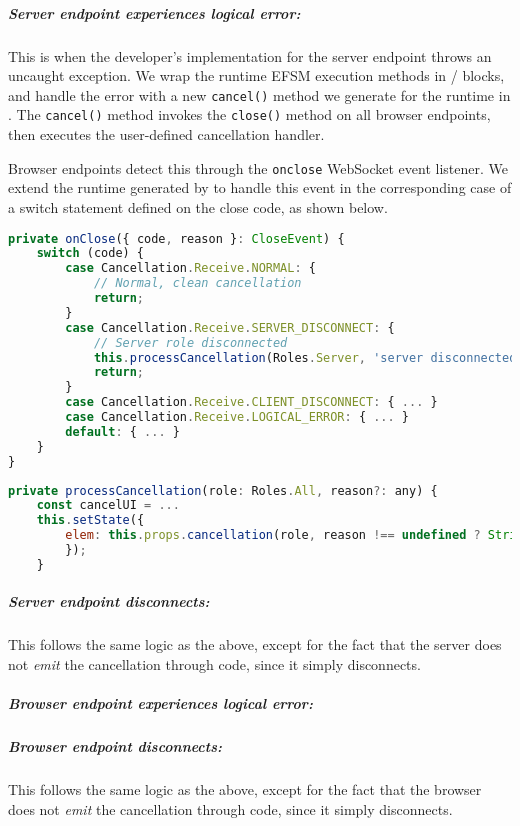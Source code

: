 \subparagraph{Server endpoint experiences logical error:}
This is when the developer's implementation for the server
endpoint throws an uncaught exception. 
We wrap the runtime EFSM execution methods in
/
blocks, and handle the error with a new \texttt{cancel()}
method we generate for the runtime in .
The \texttt{cancel()} method invokes
the \texttt{close()} method on all browser endpoints,
then executes the user-defined cancellation handler.

Browser endpoints detect this through the \texttt{onclose}
WebSocket event listener. We extend the runtime
generated by  to handle this event
in the corresponding case of a switch statement
defined on the close code, as shown below.

\begin{lstlisting}[language=javascript,tabsize=2]
private onClose({ code, reason }: CloseEvent) {
	switch (code) {
		case Cancellation.Receive.NORMAL: {
			// Normal, clean cancellation
			return;
		}
		case Cancellation.Receive.SERVER_DISCONNECT: {
			// Server role disconnected
			this.processCancellation(Roles.Server, 'server disconnected')
			return;
		}
		case Cancellation.Receive.CLIENT_DISCONNECT: { ... }
		case Cancellation.Receive.LOGICAL_ERROR: { ... }
		default: { ... }
	}
}
\end{lstlisting}

\begin{lstlisting}[language=javascript,tabsize=2]
private processCancellation(role: Roles.All, reason?: any) {
	const cancelUI = ...
	this.setState({
		elem: this.props.cancellation(role, reason !== undefined ? String(reason) : reason),
        });
    }
\end{lstlisting}

\subparagraph{Server endpoint disconnects:}
This follows the same logic as the above,
except for the fact that the server does not
\textit{emit} the cancellation through code, since
it simply disconnects.


\subparagraph{Browser endpoint experiences logical error:}


\subparagraph{Browser endpoint disconnects:}
This follows the same logic as the above,
except for the fact that the browser does not
\textit{emit} the cancellation through code, since
it simply disconnects.

